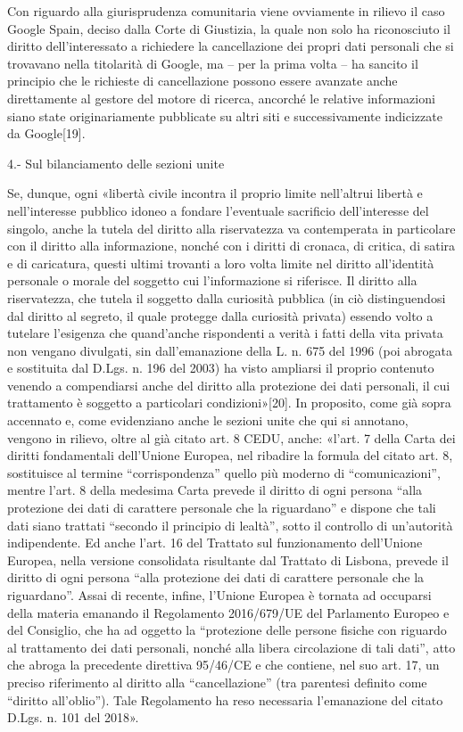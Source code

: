 Con riguardo alla giurisprudenza comunitaria viene ovviamente in rilievo il caso Google Spain, deciso dalla Corte di Giustizia, la quale non solo ha riconosciuto il diritto dell’interessato a richiedere la cancellazione dei propri dati personali che si trovavano nella titolarità di Google, ma – per la prima volta – ha sancito il principio che le richieste di cancellazione possono essere avanzate anche direttamente al gestore del motore di ricerca, ancorché le relative informazioni siano state originariamente pubblicate su altri siti e successivamente indicizzate da Google[19].



4.- Sul bilanciamento delle sezioni unite

Se, dunque, ogni «libertà civile incontra il proprio limite nell’altrui libertà e nell’interesse pubblico idoneo a fondare l’eventuale sacrificio dell’interesse del singolo, anche la tutela del diritto alla riservatezza va contemperata in particolare con il diritto alla informazione, nonché con i diritti di cronaca, di critica, di satira e di caricatura, questi ultimi trovanti a loro volta limite nel diritto all’identità personale o morale del soggetto cui l’informazione si riferisce. Il diritto alla riservatezza, che tutela il soggetto dalla curiosità pubblica (in ciò distinguendosi dal diritto al segreto, il quale protegge dalla curiosità privata) essendo volto a tutelare l’esigenza che quand’anche rispondenti a verità i fatti della vita privata non vengano divulgati, sin dall’emanazione della L. n. 675 del 1996 (poi abrogata e sostituita dal D.Lgs. n. 196 del 2003) ha visto ampliarsi il proprio contenuto venendo a compendiarsi anche del diritto alla protezione dei dati personali, il cui trattamento è soggetto a particolari condizioni»[20]. In proposito, come già sopra accennato e, come evidenziano anche le sezioni unite che qui si annotano, vengono in rilievo, oltre al già citato art. 8 CEDU, anche: «l’art. 7 della Carta dei diritti fondamentali dell’Unione Europea, nel ribadire la formula del citato art. 8, sostituisce al termine “corrispondenza” quello più moderno di “comunicazioni”, mentre l’art. 8 della medesima Carta prevede il diritto di ogni persona “alla protezione dei dati di carattere personale che la riguardano” e dispone che tali dati siano trattati “secondo il principio di lealtà”, sotto il controllo di un’autorità indipendente. Ed anche l’art. 16 del Trattato sul funzionamento dell’Unione Europea, nella versione consolidata risultante dal Trattato di Lisbona, prevede il diritto di ogni persona “alla protezione dei dati di carattere personale che la riguardano”. Assai di recente, infine, l’Unione Europea è tornata ad occuparsi della materia emanando il Regolamento 2016/679/UE del Parlamento Europeo e del Consiglio, che ha ad oggetto la “protezione delle persone fisiche con riguardo al trattamento dei dati personali, nonché alla libera circolazione di tali dati”, atto che abroga la precedente direttiva 95/46/CE e che contiene, nel suo art. 17, un preciso riferimento al diritto alla “cancellazione” (tra parentesi definito come “diritto all’oblio”). Tale Regolamento ha reso necessaria l’emanazione del citato D.Lgs. n. 101 del 2018».

